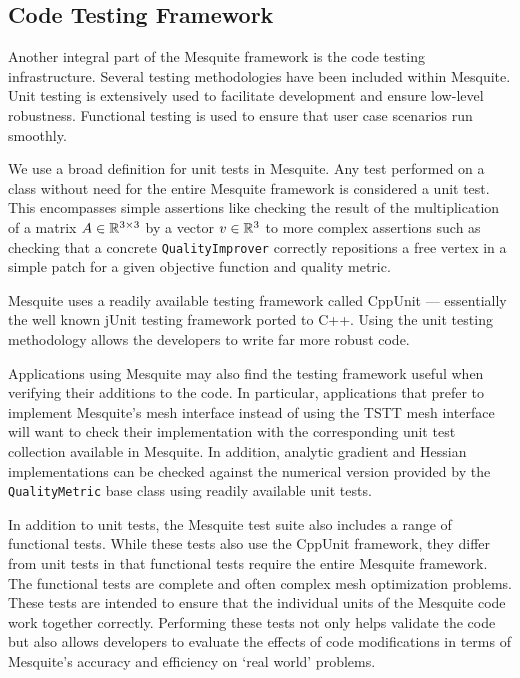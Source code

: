 \documentclass[letter]{report}
\begin{document}
\subsection{Code Testing Framework}

Another integral part of the Mesquite framework is the code testing
infrastructure.  Several testing methodologies have been included
within Mesquite. Unit testing is extensively used to facilitate
development and ensure low-level robustness. Functional testing is
used to ensure that user case scenarios run smoothly.

We use a broad definition for unit tests in Mesquite. Any test
performed on a class without need for the entire Mesquite framework is
considered a unit test. This encompasses simple assertions like
checking the result of the multiplication of a matrix $A \in
\Bbb{R}^{3 \times 3}$ by a vector $v \in \Bbb{R}^{3}$ to more complex
assertions such as checking that a concrete \texttt{QualityImprover}
correctly repositions a free vertex in a simple patch for a given
objective function and quality metric.

Mesquite uses a readily available testing framework called CppUnit
\cite{cppunit} --- essentially the well known jUnit testing framework
ported to C++.  Using the unit testing methodology allows the
developers to write far more robust code.

Applications using Mesquite may also find the testing framework useful
when verifying their additions to the code. In particular,
applications that prefer to implement Mesquite's mesh interface
instead of using the TSTT mesh interface will want to
check their implementation with the corresponding unit test collection
available in Mesquite. In addition, analytic gradient and Hessian
implementations can be checked against the numerical version provided
by the {\tt QualityMetric} base class using readily available unit
tests.

In addition to unit tests, the Mesquite test suite also includes
a range of functional tests.  While these tests also use the
CppUnit framework, they differ from unit tests in that 
functional tests require the entire Mesquite framework.
The functional tests are complete and often complex mesh
optimization problems.  These tests are intended to ensure that
the individual units of the Mesquite code work together correctly.
Performing these tests not only helps
validate the code but also allows developers to evaluate the
effects of code modifications in terms of Mesquite's accuracy
and efficiency on `real world' problems.
\end{document}
